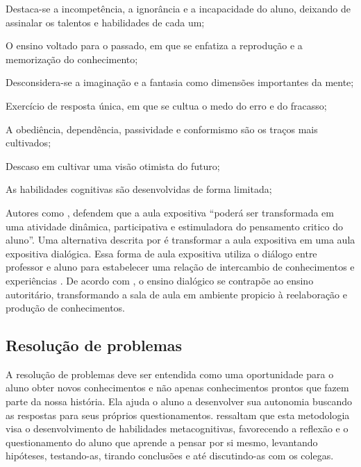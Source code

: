 \begin{alineascomponto}
\item Destaca-se a incompetência, a ignorância e a incapacidade do aluno, deixando de assinalar os talentos e habilidades de cada um; 
\item O ensino voltado para o passado, em que se enfatiza a reprodução e a memorização do conhecimento;
\item Desconsidera-se a imaginação e a fantasia como dimensões importantes da mente;
\item Exercício de resposta única, em que se cultua o medo do erro e do fracasso;
\item A obediência, dependência, passividade e conformismo são os traços mais cultivados;
\item Descaso em cultivar uma visão otimista do futuro;
\item As habilidades cognitivas são desenvolvidas de forma limitada;
\end{alineascomponto}

Autores como , defendem que a aula expositiva ``poderá ser transformada em uma atividade dinâmica, participativa e estimuladora do pensamento critico do aluno''. Uma alternativa descrita por  é transformar a aula expositiva em uma aula expositiva dialógica. Essa forma de aula expositiva utiliza o diálogo entre professor e aluno para estabelecer uma relação de intercambio de conhecimentos e experiências \cite{lopes1995aula}. De acordo com , o ensino dialógico se contrapõe ao ensino 
autoritário,  transformando  a  sala  de  aula  em  ambiente  propicio  à  reelaboração  e produção de conhecimentos.


\subsection{Resolução de problemas}\label{resolucao_problemas}

A resolução de problemas deve ser entendida como uma oportunidade para o aluno obter novos conhecimentos e não apenas conhecimentos prontos que fazem parte da nossa história. Ela ajuda o aluno a desenvolver sua autonomia buscando as respostas para seus próprios questionamentos.  ressaltam  que esta metodologia visa o desenvolvimento de habilidades metacognitivas, favorecendo a reflexão e o questionamento do aluno que aprende a pensar por si mesmo, levantando hipóteses, testando-as, tirando conclusões e até discutindo-as com os colegas.

